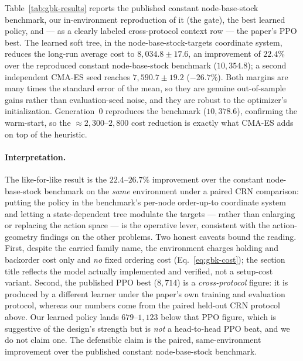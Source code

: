 Table~\ref{tab:gbk-results} reports the published constant node-base-stock benchmark, our
in-environment reproduction of it (the gate), the best learned policy, and --- as a clearly labeled
cross-protocol context row --- the paper's PPO best. The learned soft tree, in the node-base-stock-targets
coordinate system, reduces the long-run average cost to $8{,}034.8\pm17.6$, an improvement of $22.4\%$
over the reproduced constant node-base-stock benchmark ($10{,}354.8$); a second independent CMA-ES seed
reaches $7{,}590.7\pm19.2$ ($-26.7\%$). Both margins are many times the standard error of the mean, so
they are genuine out-of-sample gains rather than evaluation-seed noise, and they are robust to the
optimizer's initialization. Generation~0 reproduces the benchmark ($10{,}378.6$), confirming the
warm-start, so the $\approx 2{,}300$--$2{,}800$ cost reduction is exactly what CMA-ES adds on top of the
heuristic.

\paragraph{Interpretation.}
The like-for-like result is the $22.4$--$26.7\%$ improvement over the constant node-base-stock
benchmark on the \emph{same} environment under a paired CRN comparison: putting the policy in the
benchmark's per-node order-up-to coordinate system and letting a state-dependent tree modulate the
targets --- rather than enlarging or replacing the action space --- is the operative lever, consistent
with the action-geometry findings on the other problems. Two honest caveats bound the reading. First,
despite the carried family name, the environment charges holding and backorder cost only and \emph{no}
fixed ordering cost (Eq.~\eqref{eq:gbk-cost}); the section title reflects the model actually
implemented and verified, not a setup-cost variant. Second, the published PPO best ($8{,}714$) is a
\emph{cross-protocol} figure: it is produced by a different learner under the paper's own training and
evaluation protocol, whereas our numbers come from the paired held-out CRN protocol above. Our learned
policy lands $679$--$1{,}123$ below that PPO figure, which is suggestive of the design's strength but is
\emph{not} a head-to-head PPO beat, and we do not claim one. The defensible claim is the paired,
same-environment improvement over the published constant node-base-stock benchmark.


